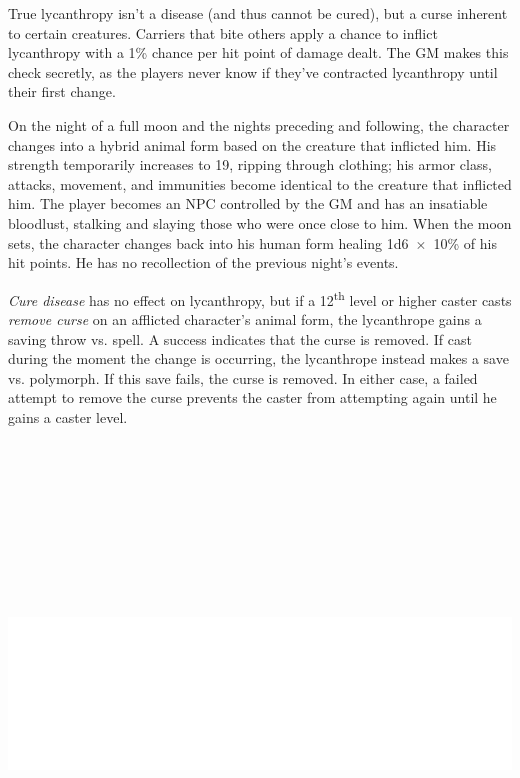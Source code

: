 \begin{multicols}{2}
True lycanthropy isn't a disease (and thus cannot be cured), but a curse inherent to certain creatures.  Carriers that bite others apply a chance to inflict lycanthropy with a 1\% chance per hit point of damage dealt.  The GM makes this check secretly, as the players never know if they've contracted lycanthropy until their first change.

On the night of a full moon and the nights preceding and following, the character changes into a hybrid animal form based on the creature that inflicted him.  His strength temporarily increases to 19, ripping through clothing; his armor class, attacks, movement, and immunities become identical to the creature that inflicted him.  The player becomes an NPC controlled by the GM and has an insatiable bloodlust, stalking and slaying those who were once close to him.  When the moon sets, the character changes back into his human form healing 1d6~$\times$~10\% of his hit points.  He has no recollection of the previous night's events.  

\textit{Cure disease} has no effect on lycanthropy, but if a 12\textsuperscript{th} level or higher caster casts \textit{remove curse} on an afflicted character's animal form, the lycanthrope gains a saving throw vs. spell.  A success indicates that the curse is removed.  If cast during the moment the change is occurring, the lycanthrope instead makes a save vs. polymorph.  If this save fails, the curse is removed.  In either case, a failed attempt to remove the curse prevents the caster from attempting again until he gains a caster level.

\end{multicols}

\noindent\includegraphics[width=6.75in, height=5.25in]{testblock.pdf} 


